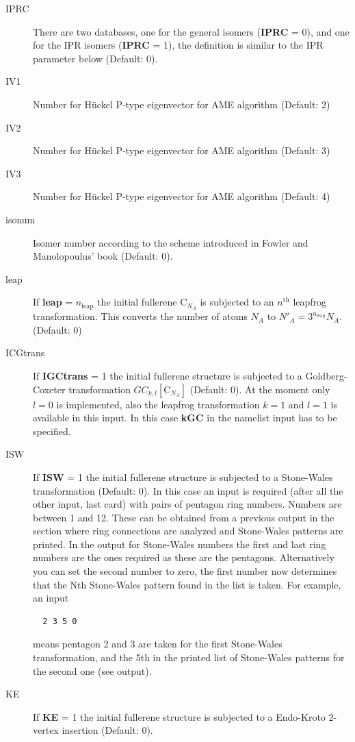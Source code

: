 \documentclass[article,a4paper,twoside]{memoir}
\newcommand{\C}[1]{\ensuremath{\mathrm{C}_{#1}}}
\newcommand{\paramname}[1]{{\color{green}\textbf{#1}}}
\begin{document}
\begin{description}
\item[{IPRC}]
There are two databases, one for the general isomers
(\paramname{IPRC} = 0), and one for the IPR isomers (\paramname{IPRC} = 1), the definition is similar to the IPR parameter below (Default: 0).
\item[{IV1}] Number for H\"uckel P-type eigenvector for AME algorithm (Default: 2)
\item[{IV2}] Number for H\"uckel P-type eigenvector for AME algorithm (Default: 3)
\item[{IV3}] Number for H\"uckel P-type eigenvector for AME algorithm (Default: 4)
\item[{isonum}] Isomer number according to the scheme introduced in Fowler and Manolopoulus' book \cite{Atlas} (Default: 0).
\item[{leap}] If \paramname{leap} = $n_\mathrm{leap}$ the initial fullerene C$_{N_A}$ is subjected to an $n^\mathrm{th}$ leapfrog transformation. 
This converts the number of atoms $N_A$ to $N'_A = 3^{n_\mathrm{leap}}N_A$. (Default: 0)
\item[{ICGtrans}] 
If \paramname{IGCtrans} = 1 the initial fullerene structure is subjected to a Goldberg-Coxeter transformation $GC_{k,l}[\C{N_A}]$ (Default: 0).
At the moment only $l=0$ is implemented, also the leapfrog transformation $k=1$ and $l=1$ is available in this input.
In this case \paramname{kGC} in the namelist input has to be specified. 
\item[ISW] 
  If \paramname{ISW} = 1 the initial fullerene structure is subjected
  to a Stone-Wales transformation (Default: 0). In this case an input
  is required (after all the other input, last card) with pairs of
  pentagon ring numbers. Numbers are between 1 and 12. These can be
  obtained from a previous output in the section where ring
  connections are analyzed and Stone-Wales patterns are printed. In
  the output for Stone-Wales numbers the first and last ring numbers
  are the ones required as these are the pentagons. Alternatively you
  can set the second number to zero, the first number now determines
  that the Nth Stone-Wales pattern found in the list is taken.  For
  example, an input
\begin{verbatim}
  2 3 5 0
\end{verbatim}
means pentagon 2 and 3 are taken for the first Stone-Wales transformation, and the 5th in the printed list of 
Stone-Wales patterns for the second one (see output).
\item[KE] 
If \paramname{KE} = 1 the initial fullerene structure is subjected to a Endo-Kroto 2-vertex insertion (Default: 0).

\end{description}
\end{document}
